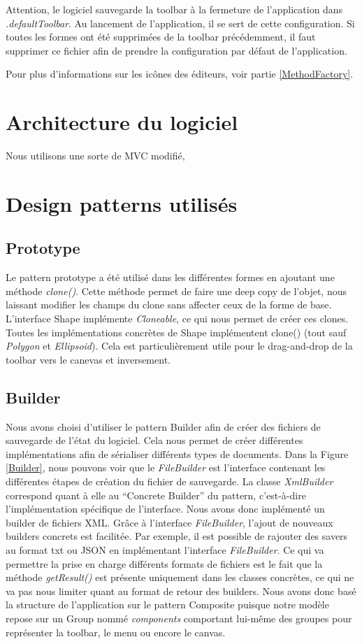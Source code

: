 \documentclass{article}
\begin{document}
Attention, le logiciel sauvegarde la toolbar à la fermeture de l'application dans \textit{.defaultToolbar}. Au lancement de l'application, il se sert de cette configuration.
Si toutes les formes ont été supprimées de la toolbar précédemment, il faut supprimer ce fichier afin de prendre la configuration par défaut de l'application.

Pour plus d'informations sur les icônes des éditeurs, voir partie \ref{MethodFactory}.


\section{Architecture du logiciel}

Nous utilisons une sorte de MVC modifié,


\section{Design patterns utilisés} \label{sec2}

\subsection{Prototype}
Le pattern prototype a été utilisé dans les différentes formes en ajoutant une méthode \textit{clone()}. Cette méthode permet de faire une deep copy de l'objet,
 nous laissant modifier les champs du clone sans affecter ceux de la forme de base.
 L'interface Shape implémente \textit{Cloneable}, ce qui nous permet de créer ces clones.
 Toutes les implémentations concrètes de Shape implémentent clone() (tout sauf \textit{Polygon} et \textit{Ellipsoid}).
 Cela est particulièrement utile pour le drag-and-drop de la toolbar vers le canevas et inversement.

\subsection{Builder}
Nous avons choisi d'utiliser le pattern Builder afin de créer des fichiers de sauvegarde de l'état du logiciel. Cela nous permet de créer différentes implémentations
afin de sérialiser différents types de documents. Dans la Figure \ref{Builder}, nous pouvons voir que le \textit{FileBuilder} est l'interface contenant les différentes étapes de création
du fichier de sauvegarde. La classe \textit{XmlBuilder} correspond quant à elle au ``Concrete Builder'' du pattern, c'est-à-dire l'implémentation spécifique
de l'interface. Nous avons donc implémenté un builder de fichiers XML. Grâce à l'interface \textit{FileBuilder}, l'ajout de nouveaux builders concrets est facilitée.
Par exemple, il est possible de rajouter des savers au format txt ou JSON en implémentant l'interface \textit{FileBuilder}.
Ce qui va permettre la prise en charge différents formats de fichiers est le fait que la méthode \textit{getResult()} est présente uniquement dans les classes concrètes, ce qui ne va pas nous
limiter quant au format de retour des builders. Nous avons donc basé la structure de l'application sur le pattern Composite puisque notre modèle repose sur un Group nommé \textit{components}
comportant lui-même des groupes pour représenter la toolbar, le menu ou encore le canvas.
\end{document}
